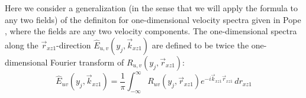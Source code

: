 \documentclass[letterpaper,11pt,nointlimits,reqno]{amsart}
\begin{document}
Here we consider a generalization (in the sense that we will apply the formula
to any two fields) of the definiton for one-dimensional velocity spectra given
in Pope \citep[\textsection{}6.3]{Pope2000Turbulent}, where the fields are any
two velocity components.  The one-dimensional spectra along the
$\vec{r}_{xz1}$-direction  $\hat{E}_{u,v}(y_j,\vec{k}_{xz1})$ are defined to be twice
the one-dimensional Fourier transform of $R_{u,v}(y_j,\vec{r}_{xz1})$:
%
\begin{equation}
\hat{E}_{uv}(y_j,\vec{k}_{xz1}) = \frac{1}{\pi} \int_{-\infty}^{\infty}
                           R_{uv}(y_j,\vec{r}_{xz1})
                           e^{-i \vec{k}_{xz1} \vec{r}_{xz1}} \,d\!r_{xz1}
\end{equation}
%

\newcommand*{\doi}[1]{\href{http://dx.doi.org/\detokenize{#1}}{doi: #1}}


\end{document}
